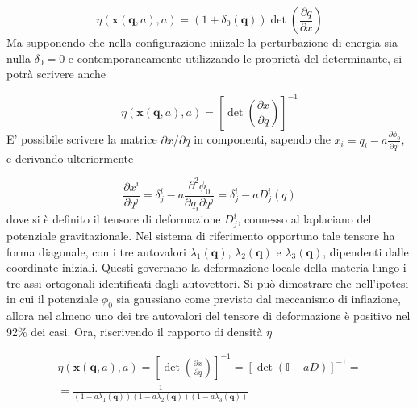 \begin{equation}
    \eta(\bm{x}(\bm{q}, a), a) = (1 + \delta_0(\bm{q}))\det\left(\frac{\partial q}{\partial x}\right) 
\end{equation}
Ma supponendo che nella configurazione iniizale la perturbazione di energia sia nulla $\delta_0 = 0$
e contemporaneamente utilizzando le proprietà del determinante, si potrà scrivere anche

\begin{equation}
    \eta(\bm{x}(\bm{q}, a), a) = \left[\det\left(\frac{\partial x}{\partial q}\right)\right]^{-1}
\end{equation}
E' possibile scrivere la matrice $\partial x$/$\partial q$ in componenti, sapendo che $x_i = q_i - a \frac{\partial\phi_0}{\partial q^i}$, 
e derivando ulteriormente 

\begin{equation}
    \frac{\partial x^i}{\partial q^j} = \delta^i_j - a \frac{\partial^2 \phi_0}{\partial q_i \partial q^j} = 
    \delta^i_j - a D^i_j(q)
\end{equation}
dove si è definito il tensore di deformazione $D^i_j$, connesso al laplaciano del potenziale gravitazionale. 
Nel sistema di riferimento opportuno tale tensore ha forma
diagonale, con i tre autovalori $\lambda_1(\bm{q})$, $\lambda_2(\bm{q})$ e $\lambda_3(\bm{q})$, dipendenti dalle
coordinate iniziali. Questi governano la deformazione locale della materia lungo i tre assi ortogonali identificati
dagli autovettori. Si può dimostrare che nell'ipotesi in cui il potenziale $\phi_0$ sia gaussiano come previsto
dal meccanismo di inflazione, allora nel almeno uno dei tre autovalori del tensore di deformazione è positivo 
nel 92$\%$ dei casi.
Ora, riscrivendo il rapporto di densità $\eta$

\begin{multline}
    \eta(\bm{x}(\bm{q}, a), a) = \left[\det\left(\frac{\partial x}{\partial q}\right)\right]^{-1} = \left[\det\left( \mathbb{I}- a D \right)\right]^{-1} = \\
    = \frac{1}{(1-a\lambda_1(\bm{q}))(1-a\lambda_2(\bm{q}))(1-a\lambda_3(\bm{q}))}
\end{multline}


